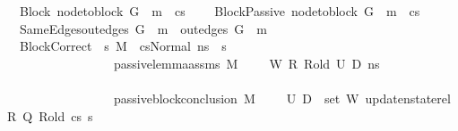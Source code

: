 \begin{isabellebody}
\ \ \ Block{\isacharcolon}{\kern0pt}\ {\isachardoublequoteopen}node{\isacharunderscore}{\kern0pt}to{\isacharunderscore}{\kern0pt}block\ G{}\ {\isacharbang}{\kern0pt}\ m\ {\isacharequal}{\kern0pt}\ cs{\isachardoublequoteclose}\ \isanewline
\ \ \ BlockPassive{\isacharcolon}{\kern0pt}\ {\isachardoublequoteopen}node{\isacharunderscore}{\kern0pt}to{\isacharunderscore}{\kern0pt}block\ G{}\ {\isacharbang}{\kern0pt}\ m\ {\isacharequal}{\kern0pt}\ cs{}{\isachardoublequoteclose}\ \isanewline
\ \isanewline
\ \ \ SameEdges{\isacharcolon}{\kern0pt}{\isachardoublequoteopen}{\isacharparenleft}{\kern0pt}out{\isacharunderscore}{\kern0pt}edges\ G{}{\isacharparenright}{\kern0pt}\ {\isacharbang}{\kern0pt}\ m\ {\isacharequal}{\kern0pt}\ {\isacharparenleft}{\kern0pt}out{\isacharunderscore}{\kern0pt}edges\ G{}{\isacharparenright}{\kern0pt}\ {\isacharbang}{\kern0pt}\ m{\isachardoublequoteclose}\ \isanewline
\ \ \ BlockCorrect{\isacharcolon}{\kern0pt}\ {\isachardoublequoteopen}{\isasymAnd}\ s{\isacharprime}{\kern0pt}{\isacharprime}{\kern0pt}{\isachardot}{\kern0pt}\ M{\isacharcomma}{\kern0pt}{\isasymLambda}{}{\isacharcomma}{\kern0pt}{\isasymGamma}{\isacharcomma}{\kern0pt}{\isasymOmega}\ {\isasymturnstile}\ {\isasymlangle}cs{\isacharcomma}{\kern0pt}Normal\ ns{\isasymrangle}\ {\isacharbrackleft}{\kern0pt}{\isasymrightarrow}{\isacharbrackright}{\kern0pt}\ s{\isacharprime}{\kern0pt}{\isacharprime}{\kern0pt}\ {\isasymLongrightarrow}\isanewline
\ \ \ \ \ \ \ \ \ \ \ \ \ \ \ \ \ \ passive{\isacharunderscore}{\kern0pt}lemma{\isacharunderscore}{\kern0pt}assms\ M\ {\isasymLambda}{}\ {\isasymLambda}{}\ {\isasymGamma}\ {\isasymOmega}\ W\ R\ R{\isacharunderscore}{\kern0pt}old\ U{}\ D{}\ ns\ {\isasymLongrightarrow}\ \ \ \ \ \ \ \ \ \ \ \ \ \ \ \ \ \ \isanewline
\ \ \ \ \ \ \ \ \ \ \ \ \ \ \ \ \ \ passive{\isacharunderscore}{\kern0pt}block{\isacharunderscore}{\kern0pt}conclusion\ M\ {\isasymLambda}{}\ {\isasymLambda}{}\ {\isasymGamma}\ {\isasymOmega}\ U{}\ {\isacharparenleft}{\kern0pt}D{}\ {\isasymunion}\ {\isacharparenleft}{\kern0pt}set\ W{\isacharparenright}{\kern0pt}{\isacharparenright}{\kern0pt}\ {\isacharparenleft}{\kern0pt}update{\isacharunderscore}{\kern0pt}nstate{\isacharunderscore}{\kern0pt}rel\ R\ Q{\isacharparenright}{\kern0pt}\ R{\isacharunderscore}{\kern0pt}old\ cs{}\ s{\isacharprime}{\kern0pt}{\isacharprime}{\kern0pt}{\isachardoublequoteclose}\ \isanewline

\end{isabellebody}
